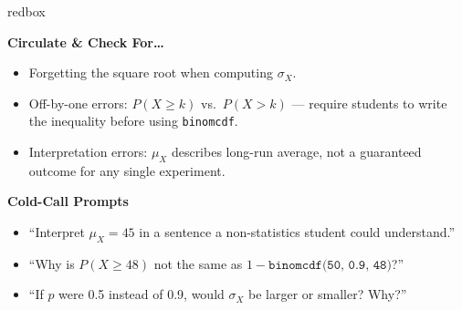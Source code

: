 \documentclass[10pt]{article}
\begin{document}
\begin{skillbox}{redbox}
\begin{minipage}[t]{0.48\linewidth}
    \textbf{Circulate \& Check For\ldots}
    \begin{itemize}
        \item Forgetting the square root when computing $\sigma_X$.
        \item Off-by-one errors: $P(X \ge k)$ vs.\ $P(X > k)$ --- require
              students to write the inequality before using \texttt{binomcdf}.
        \item Interpretation errors: $\mu_X$ describes long-run average,
              not a guaranteed outcome for any single experiment.
    \end{itemize}
\end{minipage}
\hfill
\begin{minipage}[t]{0.48\linewidth}
    \textbf{Cold-Call Prompts}
    \begin{itemize}
        \item ``Interpret $\mu_X = 45$ in a sentence a non-statistics student
              could understand.''
        \item ``Why is $P(X \ge 48)$ not the same as
              $1 - \texttt{binomcdf(50, 0.9, 48)}$?''
        \item ``If $p$ were 0.5 instead of 0.9, would $\sigma_X$ be larger
              or smaller? Why?''
    \end{itemize}
\end{minipage}
\end{skillbox}
\end{document}
